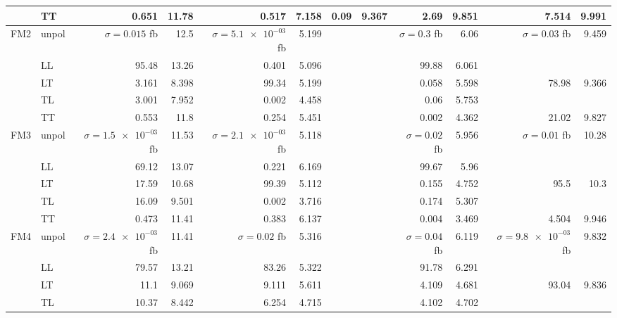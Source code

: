 \begin{table}[h]
{\begin{tabular}{llrrrrrrrrrr}
 & TT & \num{0.651} & \num{11.78} & \num{0.517} & \num{7.158} & \num{0.09} & \num{9.367} & \num{2.69} & \num{9.851} & \num{7.514} & \num{9.991} \\
\midrule
\multirow{5}{*}{FM2}
 & unpol & $\sigma = \num{0.015}$ fb & \num{12.5} & $\sigma = \num{5.1e-03}$ fb & \num{5.199} &  &  & $\sigma = \num{0.3}$ fb & \num{6.06} & $\sigma = \num{0.03}$ fb & \num{9.459} \\
 & LL & \num{95.48} & \num{13.26} & \num{0.401} & \num{5.096} &  &  & \num{99.88} & \num{6.061} &  &  \\
 & LT & \num{3.161} & \num{8.398} & \num{99.34} & \num{5.199} &  &  & \num{0.058} & \num{5.598} & \num{78.98} & \num{9.366} \\
 & TL & \num{3.001} & \num{7.952} & \num{0.002} & \num{4.458} &  &  & \num{0.06} & \num{5.753} &  &  \\
 & TT & \num{0.553} & \num{11.8} & \num{0.254} & \num{5.451} &  &  & \num{0.002} & \num{4.362} & \num{21.02} & \num{9.827} \\
\midrule
\multirow{5}{*}{FM3}
 & unpol & $\sigma = \num{1.5e-03}$ fb & \num{11.53} & $\sigma = \num{2.1e-03}$ fb & \num{5.118} &  &  & $\sigma = \num{0.02}$ fb & \num{5.956} & $\sigma = \num{0.01}$ fb & \num{10.28} \\
 & LL & \num{69.12} & \num{13.07} & \num{0.221} & \num{6.169} &  &  & \num{99.67} & \num{5.96} &  &  \\
 & LT & \num{17.59} & \num{10.68} & \num{99.39} & \num{5.112} &  &  & \num{0.155} & \num{4.752} & \num{95.5} & \num{10.3} \\
 & TL & \num{16.09} & \num{9.501} & \num{0.002} & \num{3.716} &  &  & \num{0.174} & \num{5.307} &  &  \\
 & TT & \num{0.473} & \num{11.41} & \num{0.383} & \num{6.137} &  &  & \num{0.004} & \num{3.469} & \num{4.504} & \num{9.946} \\
\midrule
\multirow{5}{*}{FM4}
 & unpol & $\sigma = \num{2.4e-03}$ fb & \num{11.41} & $\sigma = \num{0.02}$ fb & \num{5.316} &  &  & $\sigma = \num{0.04}$ fb & \num{6.119} & $\sigma = \num{9.8e-03}$ fb & \num{9.832} \\
 & LL & \num{79.57} & \num{13.21} & \num{83.26} & \num{5.322} &  &  & \num{91.78} & \num{6.291} &  &  \\
 & LT & \num{11.1} & \num{9.069} & \num{9.111} & \num{5.611} &  &  & \num{4.109} & \num{4.681} & \num{93.04} & \num{9.836} \\
 & TL & \num{10.37} & \num{8.442} & \num{6.254} & \num{4.715} &  &  & \num{4.102} & \num{4.702} &  &  \\

\end{tabular}}
\end{table}
